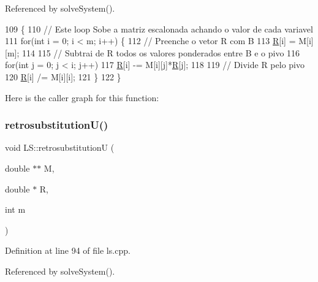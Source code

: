 Referenced by solve\+System().


\begin{DoxyCode}
109                                                          \{
110     \textcolor{comment}{// Este loop Sobe a matriz escalonada achando o valor de cada variavel}
111     \textcolor{keywordflow}{for}(\textcolor{keywordtype}{int} i = 0; i < m; i++) \{
112         \textcolor{comment}{// Preenche o vetor R com B}
113         \hyperlink{class_l_s_ade8c978a7d99f10950790c0dfec9f556}{R}[i] = M[i][m];
114 
115         \textcolor{comment}{// Subtrai de R todos os valores ponderados entre B e o pivo}
116         \textcolor{keywordflow}{for}(\textcolor{keywordtype}{int} j = 0; j < i; j++)
117             \hyperlink{class_l_s_ade8c978a7d99f10950790c0dfec9f556}{R}[i] -= M[i][j]*\hyperlink{class_l_s_ade8c978a7d99f10950790c0dfec9f556}{R}[j];
118 
119         \textcolor{comment}{// Divide R pelo pivo}
120         \hyperlink{class_l_s_ade8c978a7d99f10950790c0dfec9f556}{R}[i] /= M[i][i];
121     \}
122 \}
\end{DoxyCode}
Here is the caller graph for this function\+:
\mbox{\label{class_l_s_a092e4964121ae088307af8622af7ab64}} 
\subsubsection{\texorpdfstring{retrosubstitution\+U()}{retrosubstitutionU()}}
{\footnotesize\ttfamily void L\+S\+::retrosubstitutionU (\begin{DoxyParamCaption}\item[{double $\ast$$\ast$}]{M,  }\item[{double $\ast$}]{R,  }\item[{int}]{m }\end{DoxyParamCaption})\hspace{0.3cm}{\ttfamily [private]}}



Definition at line 94 of file ls.\+cpp.



Referenced by solve\+System().


